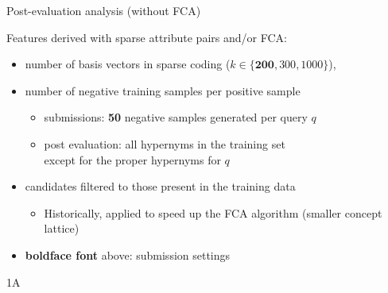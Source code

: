 \documentclass{beamer}
\newlength{\onecolwid}
\newcommand{\bull}[1]{
  \begin{itemize}
    \item #1
  \end{itemize}
}
\begin{document}
\begin{frame}[t]
\begin{columns}[t]
\begin{column}{\onecolwid}
  \begin{block}{Post-evaluation analysis (without FCA)}

    Features derived with \alert{sparse attribute pairs} and/or \alert{FCA}:
    

    \begin{itemize}
      \item number of basis vectors in sparse coding ($k \in
        \{\mathbf{200}, 300, 1000\}$),
      \item number of \alert negative training \alert samples per positive sample
        \begin{itemize}
          \item submissions: \textbf{50} negative samples generated per query $q$
          \item post evaluation: all hypernyms in the training set
            \\ except for the proper hypernyms for $q$
        \end{itemize}
      \item candidates filtered to those present in the training data
        \begin{itemize}
          \item Historically, applied to speed up the FCA algorithm
            (smaller concept lattice)
        \end{itemize}
      \item \textbf{boldface font} above: submission settings
    \end{itemize}

  \end{block}
  \begin{block}{1A}
    




\end{block}
\end{column}
\end{columns}
\end{frame}
\end{document}
